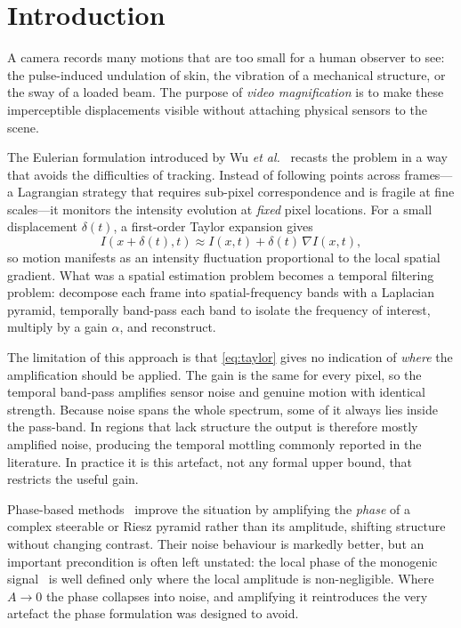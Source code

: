 \documentclass[conference]{IEEEtran}
\begin{document}
\section{Introduction}

A camera records many motions that are too small for a human observer to see:
the pulse-induced undulation of skin, the vibration of a mechanical structure,
or the sway of a loaded beam. The purpose of \emph{video magnification} is to
make these imperceptible displacements visible without attaching physical
sensors to the scene.

The Eulerian formulation introduced by Wu \emph{et al.}~\cite{wu2012} recasts
the problem in a way that avoids the difficulties of tracking. Instead of
following points across frames---a Lagrangian strategy that requires
sub-pixel correspondence and is fragile at fine scales---it monitors the
intensity evolution at \emph{fixed} pixel locations. For a small displacement
$\delta(t)$, a first-order Taylor expansion gives
\begin{equation}
I(x + \delta(t), t) \approx I(x,t) + \delta(t)\,\nabla I(x,t),
\label{eq:taylor}
\end{equation}
so motion manifests as an intensity fluctuation proportional to the local
spatial gradient. What was a spatial estimation problem becomes a temporal
filtering problem: decompose each frame into spatial-frequency bands with a
Laplacian pyramid, temporally band-pass each band to isolate the frequency of
interest, multiply by a gain $\alpha$, and reconstruct.

The limitation of this approach is that \eqref{eq:taylor} gives no indication
of \emph{where} the amplification should be applied. The gain is the same for
every pixel, so the temporal band-pass amplifies sensor noise and genuine
motion with identical strength. Because noise spans the whole spectrum, some of
it always lies inside the pass-band. In regions that lack structure the output
is therefore mostly amplified noise, producing the temporal mottling commonly
reported in the literature. In practice it is this artefact, not any formal
upper bound, that restricts the useful gain.

Phase-based methods~\cite{wadhwa2013,wadhwa2014} improve the situation by
amplifying the \emph{phase} of a complex steerable or Riesz pyramid rather
than its amplitude, shifting structure without changing contrast. Their noise
behaviour is markedly better, but an important precondition is often left
unstated: the local phase of the monogenic signal~\cite{felsberg2001} is well
defined only where the local amplitude is non-negligible. Where
$A \to 0$ the phase collapses into noise, and amplifying it reintroduces
the very artefact the phase formulation was designed to avoid.
\end{document}
